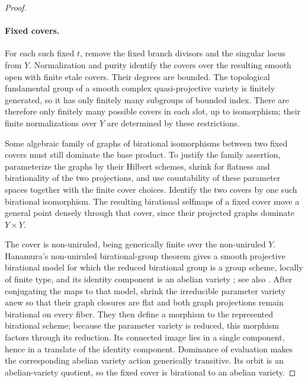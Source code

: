 \documentclass[11pt,letterpaper]{article}
\theoremstyle{definition}
\theoremstyle{remark}
\begin{document}
\begin{proof}
\paragraph{Fixed covers.}
For each such fixed \(t\), remove the fixed branch divisors and
the singular locus from \(Y\).  Normalization and purity identify
the covers over the resulting smooth open with finite etale
covers.  Their degrees are bounded.  The topological fundamental
group of a smooth complex quasi-projective variety is finitely
generated, so it has only finitely many subgroups of bounded
index.  There are therefore only finitely many possible covers
in each slot, up to isomorphism; their finite normalizations over
\(Y\) are determined by these restrictions.

Some algebraic family of graphs of birational isomorphisms between
two fixed covers must still dominate the base product.  To justify
the family assertion, parameterize the graphs by their Hilbert
schemes, shrink for flatness and birationality of the two
projections, and use countability of these parameter spaces
together with the finite cover choices.  Identify the two covers
by one such birational isomorphism.  The resulting birational
selfmaps of a fixed cover move a general point densely through
that cover, since their projected graphs dominate \(Y\times Y\).

The cover is non-uniruled, being generically finite over the
non-uniruled \(Y\).  Hanamura's non-uniruled birational-group
theorem gives a smooth projective birational model for which the
reduced birational group is a group scheme, locally of finite type,
and its identity component is an abelian variety
\cite[Theorems~2.1--2.2]{Proj-Hanamura1988};
see also \cite[Proposition~3.7 and Theorems~3.8--3.9]{Proj-Blanc2017}.
After conjugating the maps to that model, shrink the irreducible
parameter variety anew so that their graph closures are flat
and both graph projections remain birational on every fiber.
They then define a morphism to the represented birational scheme;
because the parameter variety is reduced, this morphism factors
through its reduction.  Its connected image lies in a single
component, hence in a translate of the identity component.
Dominance of evaluation makes the corresponding
abelian variety action generically transitive.  Its orbit is an
abelian-variety quotient, so the fixed cover is birational to an
abelian variety.


\end{proof}
\end{document}
